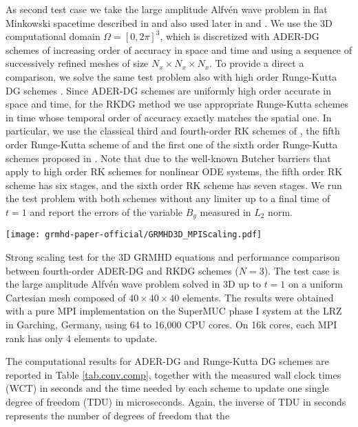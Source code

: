 As second test case we take the large amplitude Alfv\'en wave problem in flat
Minkowski spacetime described in \cite{DelZanna2007} and also used later in 
\cite{Dumbser2008} and \cite{Zanotti2015}. 
We use the 3D computational domain $\Omega=[0,2 \pi]^3$, which is discretized 
with ADER-DG schemes of increasing order of accuracy in space and time and 
using a sequence of successively refined meshes of size 
$N_x \times N_x \times N_x$. 
To provide a direct a comparison, we solve the same test problem also with high 
order Runge-Kutta DG schemes \citep{CockburnShu98,cockburn_2001_rkd}. Since 
ADER-DG schemes are uniformly high order accurate in space and time, for the 
RKDG method we use appropriate Runge-Kutta schemes in time whose temporal order 
of accuracy exactly matches the spatial one. In particular, we use the classical 
third and fourth-order RK schemes of \cite{Kutta1901}, the fifth order 
Runge-Kutta scheme of \cite{Fehlberg} and the first one of the sixth order 
Runge-Kutta schemes proposed in \cite{Butcher1964}. Note that due to the 
well-known Butcher barriers that apply to high order RK schemes for nonlinear
ODE systems, the fifth order RK scheme has six stages, and the sixth order RK 
scheme has seven stages. 
We run the test problem with both schemes without any limiter up to a final 
time of $t=1$ and report the errors of the variable $B_y$ measured in $L_2$ 
norm.
%
%
\begin{marginfigure}[-3cm]
	\texttt{[image: grmhd-paper-official/GRMHD3D\_MPIScaling.pdf]}
	\caption[
	  ADERDG vs RKDG strong scaling test (GRMHD), 
	]{ Strong scaling test for the 3D GRMHD equations and
          performance comparison between fourth-order ADER-DG and RKDG
          schemes ($N=3$).  The test case is the large amplitude Alfv\'en
          wave problem solved in 3D up to $t=1$ on a uniform Cartesian
          mesh composed of $40 \times 40 \times 40$ elements.  The
          results were obtained with a pure MPI implementation on the
          SuperMUC phase I system at the LRZ in Garching, Germany, using
          64 to 16,000 CPU cores. On 16k cores, each MPI rank has only 4
          elements to update.}
	\label{fig:scaling}
\end{marginfigure}
%
The computational results for ADER-DG and Runge-Kutta DG schemes are
reported in Table \ref{tab.conv.comp}, together with the measured wall
clock times (WCT) in seconds and the time needed by each scheme to update
one single degree of freedom (TDU) in microseconds. Again, the inverse of
TDU in seconds represents the number of degrees of freedom that the
